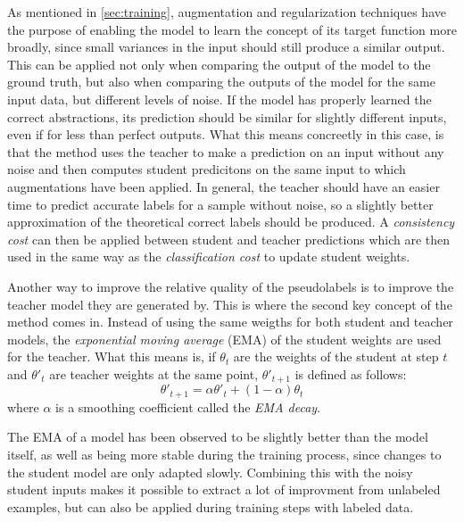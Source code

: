 As mentioned in \ref{sec:training}, augmentation and regularization techniques have the purpose of enabling the model to learn the concept of its target function more broadly, since small variances in the input should still produce a similar output. 
This can be applied not only when comparing the output of the model to the ground truth, but also when comparing the outputs of the model for the same input data, but different levels of noise. 
If the model has properly learned the correct abstractions, its prediction should be similar for slightly different inputs, even if for less than perfect outputs.
What this means concreetly in this case, is that the method uses the teacher to make a prediction on an input without any noise and then computes student predicitons on the same input to which  augmentations have been applied.
In general, the teacher should have an easier time to predict accurate labels for a sample without noise, so a slightly better approximation of the theoretical correct labels should be produced. 
A \emph{consistency cost} can then be applied between student and teacher predictions which are then used in the same way as the \emph{classification cost} to update student weights.

Another way to improve the relative quality of the pseudolabels is to improve the teacher model they are generated by.
This is where the second key concept of the method comes in.
Instead of using the same weigths for both student and teacher models, the \emph{exponential moving average} (EMA) of the student weights are used for the teacher.
What this means is, if $\theta_t$ are the weights of the student at step $t$ and $\theta'_t$ are teacher weights at the same point, $\theta'_{t+1}$ is defined as follows:
$$
    \theta'_{t + 1} = \alpha\theta'_t + (1 - \alpha) \theta_t
$$
where $\alpha$ is a smoothing coefficient called the \emph{EMA decay}.

The EMA of a model has been observed to be slightly better than the model itself, as well as being more stable during the training process, since changes to the student model are only adapted slowly. Combining this with the noisy student inputs makes it possible to extract a lot of improvment from unlabeled examples, but can also be applied during training steps with labeled data. 

